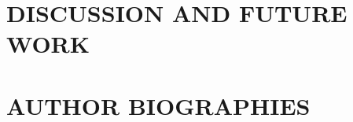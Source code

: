 \documentclass [twocolumn,a4paper,10pt]{ECMS}
\newcommand{\Section}[1]{\section*{#1}\vspace*{-0.7em}}
\begin{document}
\Section{DISCUSSION AND FUTURE WORK}



%
%
%
%
%
%


\begin{small} %








\end{small} %


\Section{AUTHOR BIOGRAPHIES}
%
\end{document}
